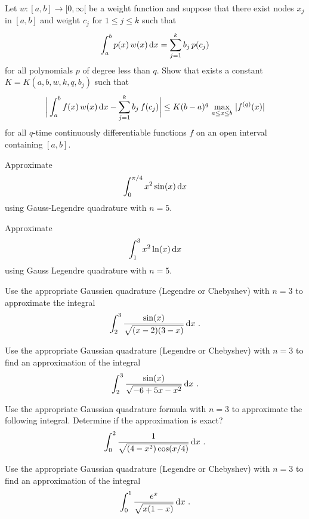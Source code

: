 \begin{question}
Let $w:[a,b]\to [0,\infty[$ be a weight function and suppose that there exist
nodes $x_j$ in $[a,b]$ and weight $c_j$ for $1\leq j \leq k$ such that
\[
\int_a^b p(x)\,w(x)\,\mathrm{d}x = \sum_{j=1}^k b_j\,p(c_j)
\]
for all polynomials $p$ of degree less than $q$.
Show that exists a constant $K = K(a,b,w,k,q,b_j)$ such that
\[
\bigg| \int_a^b  f(x)\,w(x)\,\mathrm{d}x - \sum_{j=1}^k b_j\,f(c_j)
\bigg| \leq K (b-a)^q \, \max_{a\leq x \leq b}\, |f^{(q)}(x)|
\]
for all $q$-time continuously differentiable functions
$f$ on an open interval containing $[a,b]$.
\label{diffQ26}
\end{question}

\begin{question}
Approximate
\[
  \int_0^{\pi/4} x^2 \sin(x) \,\mathrm{d}x
\]
using Gauss-Legendre quadrature with $n=5$.
\label{diffQ27}
\end{question}

\begin{question}
Approximate
\begin{equation} \label{gauss_quadr}
\int_1^3 x^2 \ln(x) \,\mathrm{d}x
\end{equation}
using Gauss Legendre quadrature with $n=5$.
\label{diffQ28}
\end{question}

\begin{question}
Use the appropriate Gaussien quadrature (Legendre or Chebyshev) with
$n=3$ to approximate the integral
\[
\int_2^3 \frac{\sin(x)}{\sqrt{(x-2)(3-x)}} \,\mathrm{d}x \ .
\]
\label{diffQ29}
\end{question}

\begin{question}
Use the appropriate Gaussian quadrature (Legendre or Chebyshev) with
$n=3$ to find an approximation of the integral
\[
\int_2^3 \frac{\sin(x)}{\sqrt{-6+5x-x^2}} \,\mathrm{d}x \ .
\]
\label{diffQ30}
\end{question}

\begin{question}
Use the appropriate Gaussian quadrature formula with $n=3$ to
approximate the following integral.  Determine if the approximation is
exact?
\[
\int_0^2 \frac{1}{\sqrt{(4-x^2)\cos(x/4)}}\,\mathrm{d}x \ .
\]
\label{diffQ31}
\end{question}

\begin{question}
Use the appropriate Gaussian quadrature (Legendre or Chebyshev) with
$n=3$ to find an approximation of the integral
\[
\int_0^1 \frac{e^x}{\sqrt{x(1-x)}} \dx{x} \ .
\]
\label{diffQ32}
\end{question}

